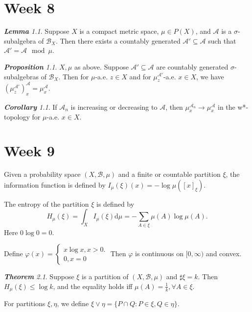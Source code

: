 \documentclass[10pt, a4paper, oneside]{report}
\numberwithin{equation}{chapter}
\theoremstyle{remark}
\newtheorem{theorem}[definition]{\bf{Theorem}}
\newtheorem{lemma}[definition]{\bf{Lemma}}
\newtheorem{proposition}[definition]{\bf{Proposition}}
\newtheorem{corollary}[definition]{\bf{Corollary}}
\theoremstyle{remark}
\begin{document}
\chapter{Week 8}
\begin{lemma}
    Suppose $X$ is a compact metric space, $\mu\in P(X)$, and $\mathcal{A}$ is a $\sigma$-subalgebra of $\mathcal{B}_X$. Then there exists a countably generated $\mathcal{A}'\subseteq\mathcal{A}$ such that $\mathcal{A}'=\mathcal{A}\mod\mu$.
\end{lemma}

\begin{proposition}
    $X,\mu$ as above. Suppose $\mathcal{A}'\subseteq\mathcal{A}$ are countably generated $\sigma$-subalgebras of $\mathcal{B}_X$. Then for $\mu$-a.e. $z\in X$ and for $\mu_z^{\mathcal{A}'}$-a.e. $x\in X$, we have $(\mu_z^{\mathcal{A}'})_x^{\mathcal{A}}=\mu_x^{\mathcal{A}}.$
\end{proposition}

\begin{corollary}
    If $\mathcal{A}_n$ is increasing or decreasing to $\mathcal{A}$, then $\mu_x^{\mathcal{A}_n}\to\mu_x^{\mathcal{A}}$ in the w*-topology for $\mu$-a.e. $x\in X$.
\end{corollary}
    
\chapter{Week 9}
Given a probability space $(X,\mathcal{B},\mu)$ and a finite or countable partition $\xi$, the information function is defined by $I_\mu(\xi)(x)=-\log\mu([x]_\xi)$.

The entropy of the partition $\xi$ is defined by $$H_\mu(\xi)=\int_X I_\mu(\xi)\mathrm{d}\mu=-\sum\limits_{A\in\xi}\mu(A)\log\mu(A).$$
Here $0\log 0=0$.

Define $\varphi(x)=\begin{cases}
x\log x,x>0.\\
0,x=0
\end{cases}$
Then $\varphi$ is continuous on $[0,\infty)$ and convex.

\begin{theorem}
    Suppose $\xi$ is a partition of $(X,\mathcal{B},\mu)$ and $\sharp\xi=k$. Then $H_\mu(\xi)\leqslant \log k$, and the equality holds iff $\mu(A)=\frac{1}{k},\forall A\in\xi.$
\end{theorem}

For partitions $\xi,\eta$, we define $\xi\vee\eta=\{P\cap Q:P\in\xi,Q\in\eta\}.$
\end{document}
